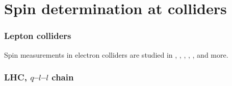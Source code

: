 \documentclass[10pt,a4paper]{article}
\begin{document}
\section{Spin determination at colliders}

\subsubsection{Lepton colliders}
Spin measurements in electron colliders are studied in \cite{Feng:1995zd}, \cite{Battaglia:2005zf}, \cite{Bhattacharyya:2005vm}, \cite{Bhattacherjee:2005qe}, \cite{Riemann:2005es}, and more.

\subsubsection[LHC, q-l-l chain]{LHC, $q$--$l$--$l$ chain}
\end{document}
